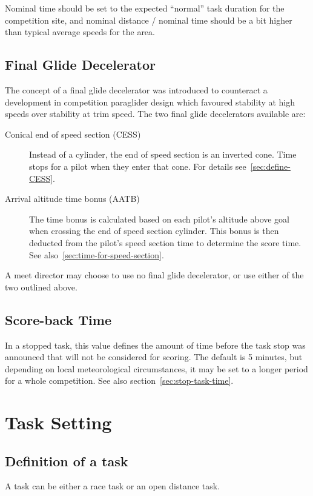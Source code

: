 \documentclass{article}
\begin{document}
Nominal time should be set to the expected “normal” task duration for the
competition site, and nominal distance / nominal time should be a bit higher
than typical average speeds for the area.

\subsection{Final Glide Decelerator}
The concept of a final glide decelerator was introduced to counteract
a development in competition paraglider design which favoured stability at high
speeds over stability at trim speed. The two final glide decelerators available
are:
\begin{description}
    \item [Conical end of speed section (CESS)]
        Instead of a cylinder, the end of speed section is an inverted cone.
        Time stops for a pilot when they enter that cone. For details
        see~\ref{sec:define-CESS}.
    \item [Arrival altitude time bonus (AATB)]
        The time bonus is calculated based on each pilot’s altitude above goal
        when crossing the end of speed section cylinder. This bonus is then
        deducted from the pilot’s speed section time to determine the score
        time. See also~\ref{sec:time-for-speed-section}.
\end{description}
A meet director may choose to use no final glide decelerator, or use either of
the two outlined above.

\label{sec:final-glide-decelerators}
\subsection{Score-back Time}
\label{sec:score-back-time}
In a stopped task, this value defines the amount of time before the task stop
was announced that will not be considered for scoring. The default is
5 minutes, but depending on local meteorological circumstances, it may be set
to a longer period for a whole competition. See also section~\ref{sec:stop-task-time}.

\newpage
\section{Task Setting}
\subsection{Definition of a task}
A task can be either a race task or an open distance task.
\end{document}
